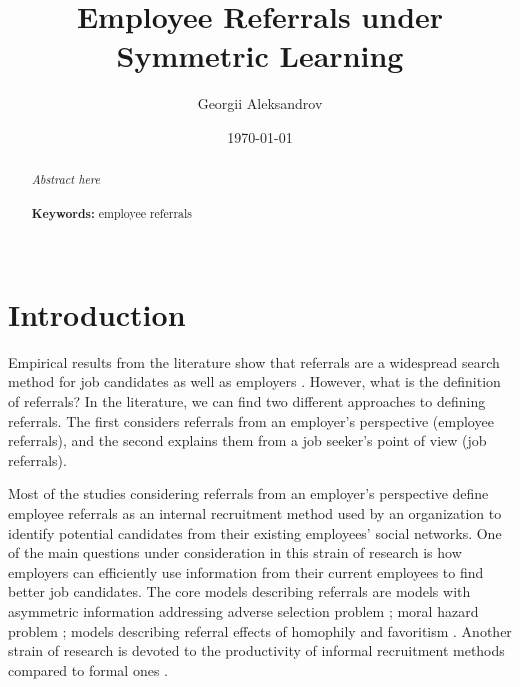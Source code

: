 \documentclass[12pt]{article}
\begin{document}
\begin{titlepage}
\title{Employee Referrals under Symmetric Learning}%
\author{Georgii Aleksandrov}%
\date{\today}
\maketitle
\begin{abstract}
\noindent \textit{Abstract here}\\
\vspace{0in}\\
\noindent\textbf{Keywords:} employee referrals\\
\vspace{0in}\\

\bigskip
\end{abstract}
\setcounter{page}{0}
\thispagestyle{empty}
\end{titlepage}
\pagebreak \newpage




\doublespacing


\section{Introduction} \label{sec:introduction}

Empirical results from the literature show that referrals are a widespread search method for job candidates \citep{holzer1987job, elliott1999social, corcoran1980most} as well as employers \citep{marsden2001social, holzer1987hiring}. However, what is the definition of referrals? In the literature, we can find two different approaches to defining referrals. The first considers referrals from an employer's perspective (employee referrals), and the second explains them from a job seeker's point of view (job referrals). 

Most of the studies considering referrals from an employer's perspective define employee referrals as an internal recruitment method used by an organization to identify potential candidates from their existing employees' social networks. One of the main questions under consideration in this strain of research is how employers can efficiently use information from their current employees to find better job candidates. The core models describing referrals are models with asymmetric information addressing adverse selection problem \citep{rees1966information, saloner1985old, ekinci2016employee}; moral hazard problem \citep{kugler2003employee, pallais2016referential, heath2018firms}; models describing referral effects of homophily and favoritism \citep{montgomery1991social, galenianos2013learning, beaman2012gets}. Another strain of research is devoted to the productivity of informal recruitment methods compared to formal ones \citep{fernandez2000social, holzer1988search}.
\end{document}
